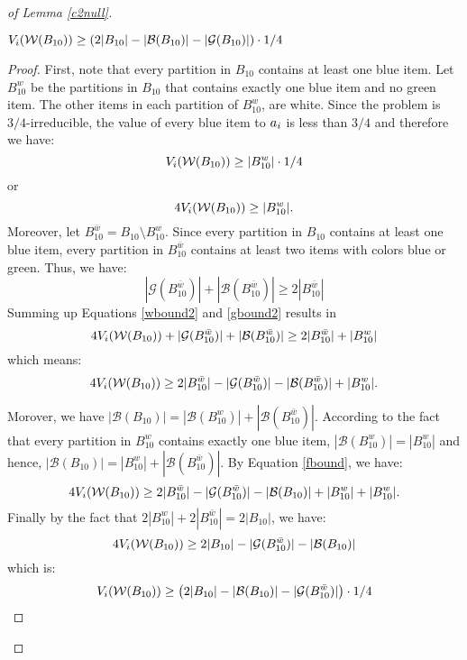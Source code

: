 \begin{proof}[of Lemma \ref{c2null}]
\begin{lemma}
\label{lowerwhite2}
$V_i(\mathcal{W}(B_{10})) \geq (2|B_{10}| - |{\mathcal{B}}(B_{10}) | - |{\mathcal{G}}(B_{10})| )\cdot 1/4$
\end{lemma}
\begin{proof}
First, note that every partition in $B_{10}$ contains at least one blue item. Let $B_{10}^{w}$ be the partitions in $B_{10}$ that contains exactly one blue item and no green item. The other items in each partition of $B_{10}^{w}$, are white. Since the problem is $3/4$-irreducible, the value of every blue item to $a_i$ is less than $3/4$ and therefore we have:
$$V_i(\mathcal{W}(B_{10})) \geq |B_{10}^{w}|\cdot 1/4$$
or 
\begin{equation}
\label{wbound2}
4V_i(\mathcal{W}(B_{10})) \geq |B_{10}^{w}|.
\end{equation}
Moreover, let $B_{10}^{\bar{w}} = B_{10} \setminus B_{10}^w$. Since every partition in $B_{10}$ contains at least one blue item, every partition in $B_{10}^{\bar{w}}$ contains at least two items with colors blue or green. Thus, we have:
\begin{equation}
\label{gbound2}
 |{\mathcal{G}}(B_{10}^{\bar{w}})| + |{\mathcal{B}}(B_{10}^{\bar{w}})| \geq 2|B_{10}^{\bar{w}}|
\end{equation}
Summing up Equations \eqref{wbound2} and \eqref{gbound2} results in 
$$
4V_i(\mathcal{W}(B_{10})) +  |{\mathcal{G}}(B_{10}^{\bar{w}})| + |{\mathcal{B}}(B_{10}^{\bar{w}})| \geq 2|B_{10}^{\bar{w}}| + |B_{10}^{w}|
$$
which means:
\begin{equation}
\label{fbound}
4V_i(\mathcal{W}(B_{10})) \geq 2|B_{10}^{\bar{w}}| -  |{\mathcal{G}}(B_{10}^{\bar{w}})| - |{\mathcal{B}}(B_{10}^{\bar{w}})|  + |B_{10}^{w}|.
\end{equation}

Morover, we have $|{\mathcal{B}}(B_{10})| = |{\mathcal{B}}(B_{10}^{w})|+|{\mathcal{B}}(B_{10}^{\bar{w}})|$. According to the fact that every partition in $B_{10}^w$ contains exactly one blue item, $|{\mathcal{B}}(B_{10}^{w})| = |B_{10}^w|$ and hence, $|{\mathcal{B}}(B_{10})| = |B_{10}^w|+|{\mathcal{B}}(B_{10}^{\bar{w}})|$. By Equation \eqref{fbound}, we have:
$$ 4V_i(\mathcal{W}(B_{10})) \geq 2|B_{10}^{\bar{w}}| -  |{\mathcal{G}}(B_{10}^{\bar{w}})| -|{\mathcal{B}}(B_{10})|+ |B_{10}^w|  + |B_{10}^{w}|. $$
Finally by the fact that $2|B_{10}^{w}| + 2|B_{10}^{\bar{w}}| = 2|B_{10}|$, we have:
$$ 4V_i(\mathcal{W}(B_{10})) \geq 2|B_{10}| -  |{\mathcal{G}}(B_{10}^{\bar{w}})| -|{\mathcal{B}}(B_{10})| $$
which is:
$$ V_i(\mathcal{W}(B_{10})) \geq \big(2|B_{10}| -|{\mathcal{B}}(B_{10})|-  |{\mathcal{G}}(B_{10}^{\bar{w}})| \big) \cdot 1/4$$
\end{proof}



\end{proof}
